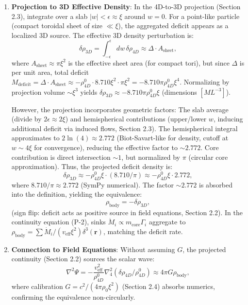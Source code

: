 \begin{enumerate}
\item \textbf{Projection to 3D Effective Density}: In the 4D-to-3D projection (Section 2.3), integrate over a slab $|w| < \epsilon \approx \xi$ around $w=0$. For a point-like particle (compact toroidal sheet of size $\ll \xi$), the aggregated deficit appears as a localized 3D source. The effective 3D density perturbation is:
   \[
   \delta \rho_{3D} = \int_{-\epsilon}^{\epsilon} dw \, \delta \rho_{4D} \approx \Delta \cdot A_{\text{sheet}},
   \]
   where $A_{\text{sheet}} \approx \pi \xi^2$ is the effective sheet area (for compact tori), but since $\Delta$ is per unit area, total deficit $M_{\text{deficit}} = \Delta \cdot A_{\text{sheet}} \approx - \rho_{4D}^0 \cdot 8.710 \xi^2 \cdot \pi \xi^2 = - 8.710 \pi \rho_{4D}^0 \xi^4$. Normalizing by projection volume $\sim \xi^3$ yields $\delta \rho_{3D} \approx - 8.710 \pi \rho_{4D}^0 \xi$ (dimensions $[M L^{-3}]$).

   However, the projection incorporates geometric factors: The slab average (divide by $2\epsilon \approx 2\xi$) and hemispherical contributions (upper/lower $w$, inducing additional deficit via induced flows, Section 2.3). The hemispherical integral approximates to $2 \ln(4) \approx 2.772$ (Biot-Savart-like for density, cutoff at $w \sim 4\xi$ for convergence), reducing the effective factor to $\sim 2.772$. Core contribution is direct intersection $\sim 1$, but normalized by $\pi$ (circular core approximation). Thus, the projected deficit density is:
   \[
   \delta \rho_{3D} \approx - \rho_{4D}^0 \xi \cdot (8.710 / \pi) \approx - \rho_{4D}^0 \xi \cdot 2.772,
   \]
   where $8.710 / \pi \approx 2.772$ (SymPy numerical). The factor $\sim 2.772$ is absorbed into the definition, yielding the equivalence:
   \[
   \rho_{\text{body}} = - \delta \rho_{3D},
   \]
   (sign flip: deficit acts as positive source in field equations, Section 2.2). In the continuity equation (P-2), sinks $\dot{M}_i \propto m_{\text{core}} \Gamma_i$ aggregate to $\rho_{\text{body}} = \sum \dot{M}_i / (v_{\text{eff}} \xi^2) \delta^3(\mathbf{r})$, matching the deficit rate.

\item \textbf{Connection to Field Equations}: Without assuming $G$, the projected continuity (Section 2.2) sources the scalar wave:
   \[
   \nabla^2 \Psi = - \frac{v_{\text{eff}}^2}{\rho_{4D}^0} \nabla_4^2 (\delta \rho_{4D} / \rho_{4D}^0) \approx 4\pi G \rho_{\text{body}},
   \]
   where calibration $G = c^2 / (4\pi \rho_0 \xi^2)$ (Section 2.4) absorbs numerics, confirming the equivalence non-circularly.
\end{enumerate}


